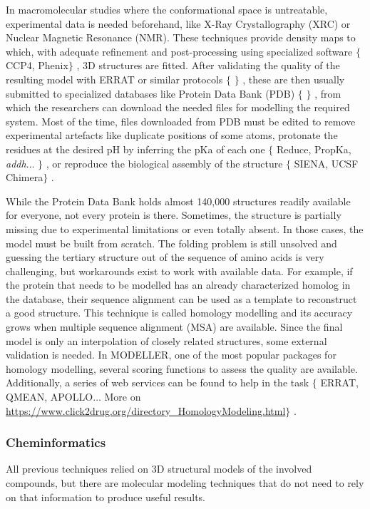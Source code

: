 In macromolecular studies where the conformational space is untreatable, experimental data is needed beforehand, like X-Ray Crystallography (XRC) or Nuclear Magnetic Resonance (NMR). These techniques provide density maps to which, with adequate refinement and post-processing using specialized software $ \{ $ CCP4, Phenix$ \} $ , 3D structures are fitted. After validating the quality of the resulting model with ERRAT or similar protocols $ \{ $ $ \} $ , these are then usually submitted to specialized databases like Protein Data Bank (PDB) $ \{ $ $ \} $ , from which the researchers can download the needed files for modelling the required system. Most of the time, files downloaded from PDB must be edited to remove experimental artefacts like duplicate positions of some atoms, protonate the residues at the desired pH by inferring the pKa of each one $ \{ $ Reduce, PropKa, \textit{addh}$ \ldots $ $ \} $ , or reproduce the biological assembly of the structure $ \{ $ SIENA, UCSF Chimera$ \} $ .

While the Protein Data Bank holds almost 140,000 structures readily available for everyone, not every protein is there. Sometimes, the structure is partially missing due to experimental limitations or even totally absent. In those cases, the model must be built from scratch. The folding problem is still unsolved and guessing the tertiary structure out of the sequence of amino acids is very challenging, but workarounds exist to work with available data. For example, if the protein that needs to be modelled has an already characterized homolog in the database, their sequence alignment can be used as a template to reconstruct a good structure. This technique is called homology modelling and its accuracy grows when multiple sequence alignment (MSA) are available. Since the final model is only an interpolation of closely related structures, some external validation is needed. In MODELLER, one of the most popular packages for homology modelling, several scoring functions to assess the quality are available. Additionally, a series of web services can be found to help in the task $ \{ $ ERRAT, QMEAN, APOLLO$ \ldots $  More on \href{https://www.click2drug.org/directory\_HomologyModeling.html}{https://www.click2drug.org/directory\_HomologyModeling.html}$ \} $ .\

\subsubsection{Cheminformatics}
All previous techniques relied on 3D structural models of the involved compounds, but there are molecular modeling techniques that do not need to rely on that information to produce useful results.

